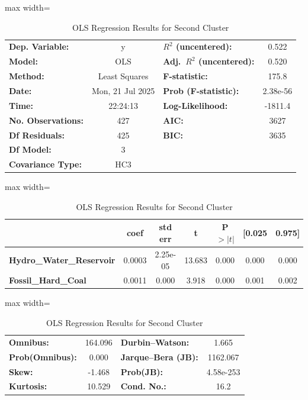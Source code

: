 \documentclass{article}
\begin{document}
\begin{table}[t]
\centering
\caption{OLS Regression Results for Second Cluster}
\label{tab:ols_results_Second_cluster}
\setlength\tabcolsep{3.5pt}
\renewcommand{\arraystretch}{1.15}
\small

\begin{adjustbox}{max width=\textwidth}
\begin{tabular}{lclc}
\toprule
\textbf{Dep. Variable:} & y & \textbf{$R^2$ (uncentered):} & 0.522 \\
\textbf{Model:}         & OLS & \textbf{Adj.\ $R^2$ (uncentered):} & 0.520 \\
\textbf{Method:}        & Least Squares & \textbf{F-statistic:} & 175.8 \\
\textbf{Date:}          & Mon, 21 Jul 2025 & \textbf{Prob (F-statistic):} & 2.38e-56 \\
\textbf{Time:}          & 22:24:13 & \textbf{Log-Likelihood:} & -1811.4 \\
\textbf{No. Observations:} & 427 & \textbf{AIC:} & 3627 \\
\textbf{Df Residuals:}  & 425 & \textbf{BIC:} & 3635 \\
\textbf{Df Model:}      & 3   &               &      \\
\textbf{Covariance Type:} & HC3 &             &      \\
\bottomrule
\end{tabular}
\end{adjustbox}

\vspace{0.6em}

\begin{adjustbox}{max width=\textwidth}
\begin{tabular}{lcccccc}
 & \textbf{coef} & \textbf{std err} & \textbf{t} & \textbf{P$>|t|$} & \textbf{[0.025} & \textbf{0.975]} \\
\midrule
\textbf{Hydro\_Water\_Reservoir} & 0.0003 & 2.25e-05 & 13.683 & 0.000 & 0.000 & 0.000 \\
\textbf{Fossil\_Hard\_Coal}      & 0.0011 & 0.000    & 3.918  & 0.000 & 0.001 & 0.002 \\
\bottomrule
\end{tabular}
\end{adjustbox}

\vspace{0.6em}

\begin{adjustbox}{max width=\textwidth}
\begin{tabular}{lclc}
\textbf{Omnibus:}       & 164.096 & \textbf{Durbin--Watson:} & 1.665 \\
\textbf{Prob(Omnibus):} & 0.000   & \textbf{Jarque--Bera (JB):} & 1162.067 \\
\textbf{Skew:}          & -1.468  & \textbf{Prob(JB):} & 4.58e-253 \\
\textbf{Kurtosis:}      & 10.529  & \textbf{Cond. No.:} & 16.2 \\
\bottomrule
\end{tabular}
\end{adjustbox}


\end{table}
\end{document}
